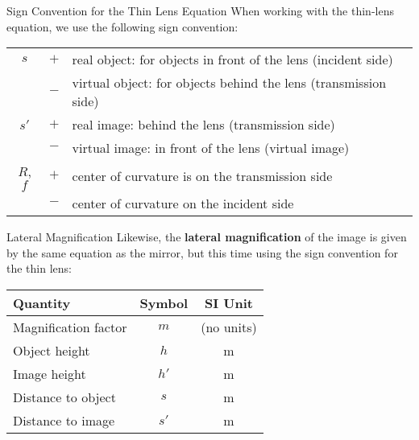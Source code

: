 \documentclass[12pt,compress,aspectratio=169]{beamer}
\newcommand{\eq}[2]{\vspace{#1}{\LARGE\begin{displaymath}#2\end{displaymath}}}
\begin{document}
\begin{frame}{Sign Convention for the Thin Lens Equation}
  When working with the thin-lens equation, we use the following sign
  convention:
  
  \eq{-.2in}{
    \boxed{\frac1s+\frac1{s'}=\frac1f}
  }
  \begin{center}
    \begin{tabular}{ccl}
      \hline
      $s$ & $+$ & real object: for objects in front of the lens (incident
      side) \\
      & $-$ & virtual object: for objects behind the lens (transmission side)
      \\\hline
      $s'$ & $+$ & real image: behind the lens (transmission side)\\
      & $-$ & virtual image: in front of the lens (virtual image)\\\hline
      $R$, $f$ & $+$ & center of curvature is on the transmission side\\
      & $-$ & center of curvature on the incident side\\
      \hline
    \end{tabular}
  \end{center}
\end{frame}



\begin{frame}{Lateral Magnification}
  Likewise, the  \textbf{lateral magnification} of the image is given by the
  same equation as the mirror, but this time using the sign convention for
  the thin lens:

  \eq{-.2in}{
    \boxed{m=\frac{h'}h=-\frac{s'}s}
  }
  \begin{center}
    \begin{tabular}{l|c|c}
      \rowcolor{pink}
      \textbf{Quantity} & \textbf{Symbol} & \textbf{SI Unit} \\ \hline
      Magnification factor & $m$ & (no units)\\
      Object height & $h$  & \si{\metre} \\
      Image height  & $h'$ & \si{\metre} \\
      Distance to object & $s$  & \si{\metre} \\
      Distance to image  & $s'$ & \si{\metre}
    \end{tabular}
  \end{center}
\end{frame}
\end{document}

